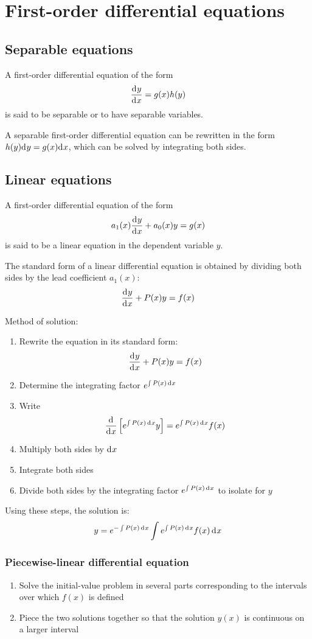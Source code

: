 \documentclass[10pt, twocolumn]{article}
\theoremstyle{definition}
\begin{document}
\section{First-order differential equations}
\subsection{Separable equations}
A first-order differential equation of the form
\[
  \frac{\mathrm{d}^{} y}{\mathrm{d}^{} x} = g(x)h(y)
\]
is said to be separable or to have separable variables.

A separable first-order differential equation can be rewritten in the form \(h(y)\mathrm{d}^{} y = g(x)\mathrm{d}^{} x\), which can be solved by integrating both sides.


\subsection{Linear equations}
A first-order differential equation of the form
\[
  a_1 (x)\frac{\mathrm{d}^{} y}{\mathrm{d}^{} x} + a_0 (x)y = g(x)
\]
is said to be a linear equation in the dependent variable \(y\).

The standard form of a linear differential equation is obtained by dividing both sides by the lead coefficient \(a_1 (x)\):
\[
  \frac{\mathrm{d}^{} y}{\mathrm{d}^{} x} + P(x)y = f(x)
\]

Method of solution:
\begin{enumerate}
  \item Rewrite the equation in its standard form:
        \[
          \frac{\mathrm{d}^{} y}{\mathrm{d}^{} x} + P(x)y = f(x)
        \]
  \item Determine the integrating factor \(e^{\int{P(x) \,\mathrm{d}^{} x}}\)
  \item Write
        \[
          \frac{\mathrm{d}^{}}{\mathrm{d}^{} x}\left[ e^{\int{P(x) \,\mathrm{d}^{} x}}y \right] = e^{\int{P(x) \,\mathrm{d}^{} x}}f(x)
        \]
  \item Multiply both sides by \(\mathrm{d}^{} x\)
  \item Integrate both sides
  \item Divide both sides by the integrating factor \(e^{\int{P(x) \,\mathrm{d}^{} x}}\) to isolate for \(y\)
\end{enumerate}

Using these steps, the solution is:
\[
  y = e^{-\int{P(x) \,\mathrm{d}^{} x}} \int{e^{\int{P(x) \,\mathrm{d}^{} x}}f(x) \,\mathrm{d}^{} x}
\]


\subsubsection*{Piecewise-linear differential equation}
\begin{enumerate}
  \item Solve the initial-value problem in several parts corresponding to the intervals over which \(f(x)\) is defined
  \item Piece the two solutions together so that the solution \(y(x)\) is continuous on a larger interval
\end{enumerate}
\end{document}
